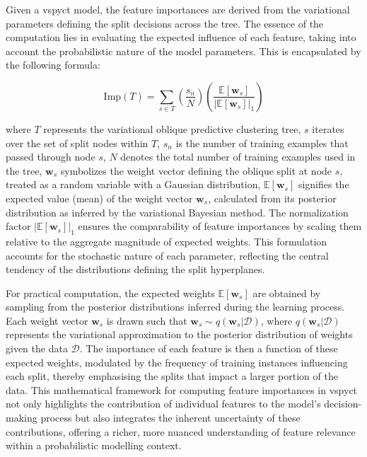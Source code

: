 \documentclass[3p,review,authoryear]{elsarticle}
\begin{document}
Given a \gls{vspyct} model, the feature importances are derived from the variational parameters defining the split decisions across the tree.
The essence of the computation lies in evaluating the expected influence of each feature, taking into account the probabilistic nature of the model parameters.
This is encapsulated by the following formula:

\begin{equation}
\text{Imp}(T) = \sum_{s \in T} \left( \frac{s_n}{N} \right) \left( \frac{\mathbb{E}[\mathbf{w}_s]}{|\mathbb{E}[\mathbf{w}_s]|_1} \right)
\end{equation}

where $T$ represents the variational oblique predictive clustering tree, $s$ iterates over the set of split nodes within $T$, $s_n$ is the number of training examples that passed through node $s$, $N$ denotes the total number of training examples used in the tree, $\mathbf{w}_s$ symbolizes the weight vector defining the oblique split at node $s$, treated as a random variable with a Gaussian distribution, $\mathbb{E}[\mathbf{w}_s]$ signifies the expected value (mean) of the weight vector $\mathbf{w}_s$, calculated from its posterior distribution as inferred by the variational Bayesian method.
The normalization factor $|\mathbb{E}[\mathbf{w}_s]|_1$ ensures the comparability of feature importances by scaling them relative to the aggregate magnitude of expected weights.
This formulation accounts for the stochastic nature of each parameter, reflecting the central tendency of the distributions defining the split hyperplanes.

For practical computation, the expected weights $\mathbb{E}[\mathbf{w}_s]$ are obtained by sampling from the posterior distributions inferred during the learning process.
Each weight vector $\mathbf{w}_s$ is drawn such that $\mathbf{w}_s \sim q(\mathbf{w}_s|\mathcal{D})$, where $q(\mathbf{w}_s|\mathcal{D})$ represents the variational approximation to the posterior distribution of weights given the data $\mathcal{D}$.
The importance of each feature is then a function of these expected weights, modulated by the frequency of training instances influencing each split, thereby emphasising the splits that impact a larger portion of the data.
This mathematical framework for computing feature importances in \gls{vspyct} not only highlights the contribution of individual features to the model's decision-making process but also integrates the inherent uncertainty of these contributions, offering a richer, more nuanced understanding of feature relevance within a probabilistic modelling context.
\end{document}
